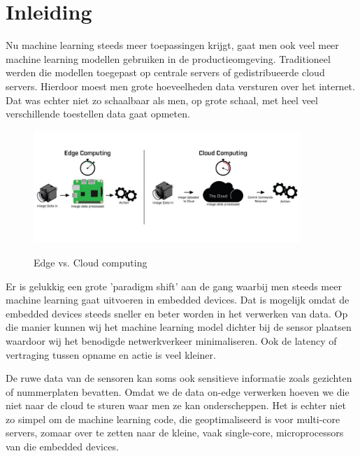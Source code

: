 \section{Inleiding}

Nu machine learning steeds meer toepassingen krijgt, gaat men ook veel meer machine learning modellen gebruiken in de productieomgeving.
Traditioneel werden die modellen toegepast op centrale servers of gedistribueerde cloud servers. Hierdoor moest men grote hoeveelheden data versturen over het internet.
Dat was echter niet zo schaalbaar als men, op grote schaal, met heel veel verschillende toestellen data gaat opmeten. %

\begin{figure}[ht]
	\centering
	\includegraphics[width=0.9\textwidth]{figuren/iisedgecomputing.jpg}
	\caption{Edge vs. Cloud computing}
	\cite{flir-edge-computing}
	\label{fig:edge-vs-cloud}
\end{figure}

Er is gelukkig een grote 'paradigm shift' aan de gang waarbij men steeds meer machine learning gaat uitvoeren in embedded devices.
Dat is mogelijk omdat de embedded devices steeds sneller en beter worden in het verwerken van data.
Op die manier kunnen wij het machine learning model dichter bij de sensor plaatsen waardoor wij het benodigde netwerkverkeer minimaliseren.
Ook de latency of vertraging tussen opname en actie is veel kleiner. \cite{flir-edge-computing}

De ruwe data van de sensoren kan soms ook sensitieve informatie zoals gezichten of nummerplaten bevatten. Omdat we de data on-edge verwerken hoeven we die niet naar de cloud te sturen waar men ze kan onderscheppen. \cite{flir-edge-computing}
Het is echter niet zo simpel om de machine learning code, die geoptimaliseerd is voor multi-core servers, zomaar over te zetten naar de kleine, vaak single-core, microprocessors van die embedded devices.

